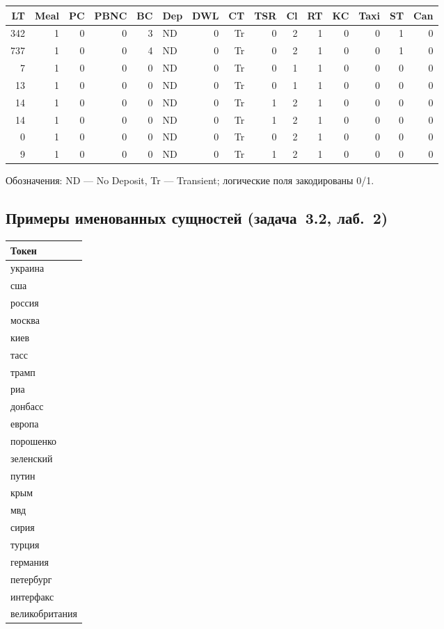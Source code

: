 \begin{center}
\scriptsize
\setlength{\tabcolsep}{2pt}
\begin{tabular}{@{}rrrrrlrrrrrrrrr@{}}
 \toprule
 LT & Meal & PC & PBNC & BC & Dep & DWL & CT & TSR & Cl & RT & KC & Taxi & ST & Can \\
 \midrule
342 & 1 & 0 & 0 & 3 & ND & 0 & Tr & 0 & 2 & 1 & 0 & 0 & 1 & 0 \\
737 & 1 & 0 & 0 & 4 & ND & 0 & Tr & 0 & 2 & 1 & 0 & 0 & 1 & 0 \\
7 & 1 & 0 & 0 & 0 & ND & 0 & Tr & 0 & 1 & 1 & 0 & 0 & 0 & 0 \\
13 & 1 & 0 & 0 & 0 & ND & 0 & Tr & 0 & 1 & 1 & 0 & 0 & 0 & 0 \\
14 & 1 & 0 & 0 & 0 & ND & 0 & Tr & 1 & 2 & 1 & 0 & 0 & 0 & 0 \\
14 & 1 & 0 & 0 & 0 & ND & 0 & Tr & 1 & 2 & 1 & 0 & 0 & 0 & 0 \\
0 & 1 & 0 & 0 & 0 & ND & 0 & Tr & 0 & 2 & 1 & 0 & 0 & 0 & 0 \\
9 & 1 & 0 & 0 & 0 & ND & 0 & Tr & 1 & 2 & 1 & 0 & 0 & 0 & 0 \\
 \bottomrule
\end{tabular}
\end{center}

Обозначения: ND --- No Deposit, Tr --- Transient; логические поля закодированы 0/1.

\subsection{Примеры именованных сущностей (задача~3.2, лаб.~2)}
\label{app:data-entities}
\begin{center}
\footnotesize
\begin{tabular}{@{}l@{}}
 \toprule
\textbf{Токен} \\
 \midrule
украина \\
сша \\
россия \\
москва \\
киев \\
тасс \\
трамп \\
риа \\
донбасс \\
европа \\
порошенко \\
зеленский \\
путин \\
крым \\
мвд \\
сирия \\
турция \\
германия \\
петербург \\
интерфакс \\
великобритания \\
 \bottomrule
\end{tabular}
\end{center}
